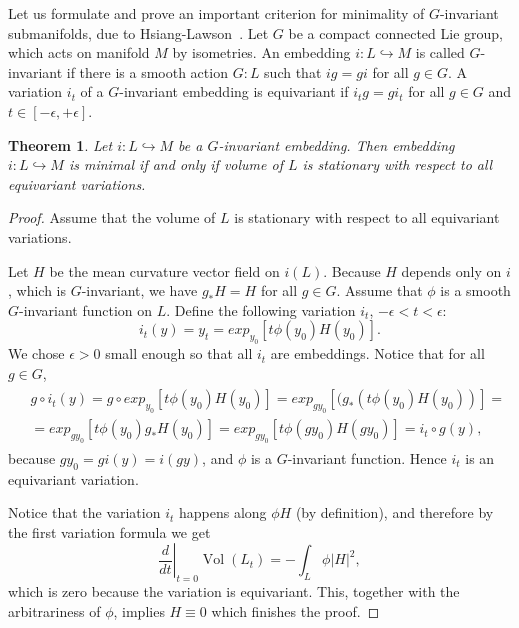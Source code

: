 \documentclass[jsg]{IP_v1_forauthors}
\def\Vol{\mathop{\mathrm{Vol}}}
\newtheorem{theo}{Theorem}[section]
\theoremstyle{definition}
\numberwithin{equation}{section}
\begin{document}
Let us formulate and prove an important criterion for minimality of $G$-invariant submanifolds, due to Hsiang-Lawson~\cite{HL}. Let $G$ be a compact connected Lie group, which acts on manifold $M$ by isometries. An embedding $i: L \hookrightarrow M$ is called $G$-invariant if there is a smooth action $G:L$ such that $ig=gi$ for all $g \in G$. A variation $i_t$ of a $G$-invariant embedding is equivariant if $i_t g= g i_t$ for all $g \in G$ and $t \in [-\epsilon,+\epsilon]$.
\begin{theo}\label{theo2.3}
Let $i: L \hookrightarrow M$ be a $G$-invariant embedding. Then embedding $i: L \hookrightarrow M$ is minimal if and only if volume of $L$ is stationary with respect to all equivariant variations.
\end{theo}
\begin{proof}
Assume that the volume of $L$ is stationary with respect to all equivariant variations.

Let $H$ be the mean curvature vector field on $i(L)$. Because $H$ depends only on $i$, which is $G$-invariant, we have $g_{*}H=H$ for all $g \in G$.
Assume that $\phi$ is a smooth $G$-invariant function on $L$. Define the following variation $i_t$, $-\epsilon < t < \epsilon$:
\begin{equation}
i_t(y)=y_t=exp_{y_0}[t\phi(y_0)H(y_0)].
\end{equation}
We chose $\epsilon > 0$ small enough so that all $i_t$ are embeddings. Notice that for all $g \in G$,
\begin{align}
\begin{split}
& g \circ i_t(y) = g \circ exp_{y_0}[t\phi(y_0)H(y_0)] =  exp_{g y_0}[(g_* (t\phi(y_0)H(y_0))] =          \\
&=exp_{g y_0}[t\phi( y_0)g_* H( y_0)] =  exp_{g y_0}[t\phi(g y_0) H( g y_0)] = i_t \circ g(y),
\end{split}
\end{align}
because $g y_0 = g i(y) = i (gy)$, and $\phi$ is a $G$-invariant function. Hence $i_t$ is an equivariant variation.

Notice that the variation $i_t$ happens along $\phi H$ (by definition), and therefore by the first variation formula we get
\begin{equation} 
\left. \frac d{dt} \right |_{t=0} \Vol(L_t) = - \int_L \phi |H|^2 , 
\end{equation}
which is zero because the variation is equivariant. This, together with the arbitrariness of $\phi$, implies $H \equiv 0$ which finishes the proof.
\end{proof}
\end{document}
